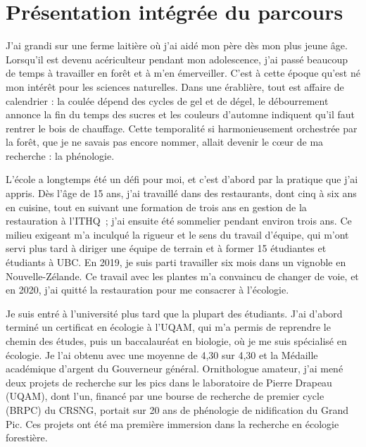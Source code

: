 \documentclass[12pt]{article}
\begin{document}
\section*{Présentation intégrée du parcours}
J'ai grandi sur une ferme laitière où j'ai aidé mon père dès mon plus jeune âge. Lorsqu'il est devenu acériculteur pendant mon adolescence, j'ai passé beaucoup de temps à travailler en forêt et à m'en émerveiller. C'est à cette époque qu'est né mon intérêt pour les sciences naturelles. Dans une érablière, tout est affaire de calendrier : la coulée dépend des cycles de gel et de dégel, le débourrement annonce la fin du temps des sucres et les couleurs d'automne indiquent qu'il faut rentrer le bois de chauffage. Cette temporalité si harmonieusement orchestrée par la forêt, que je ne savais pas encore nommer, allait devenir le cœur de ma recherche : la phénologie.

L'école a longtemps été un défi pour moi, et c'est d'abord par la pratique que j'ai appris. Dès l'âge de 15 ans, j'ai travaillé dans des restaurants, dont cinq à six ans en cuisine, tout en suivant une formation de trois ans en gestion de la restauration à l'ITHQ~; j'ai ensuite été sommelier pendant environ trois ans. Ce milieu exigeant m'a inculqué la rigueur et le sens du travail d'équipe, qui m'ont servi plus tard à diriger une équipe de terrain et à former 15 étudiantes et étudiants à UBC. En 2019, je suis parti travailler six mois dans un vignoble en Nouvelle-Zélande. Ce travail avec les plantes m'a convaincu de changer de voie, et en 2020, j'ai quitté la restauration pour me consacrer à l'écologie.

Je suis entré à l'université plus tard que la plupart des étudiants. J'ai d'abord terminé un certificat en écologie à l'UQAM, qui m'a permis de reprendre le chemin des études, puis un baccalauréat en biologie, où je me suis spécialisé en écologie. Je l'ai obtenu avec une moyenne de 4,30 sur 4,30 et la Médaille académique d'argent du Gouverneur général. Ornithologue amateur, j'ai mené deux projets de recherche sur les pics dans le laboratoire de Pierre Drapeau (UQAM), dont l'un, financé par une bourse de recherche de premier cycle (BRPC) du CRSNG, portait sur 20 ans de phénologie de nidification du Grand Pic. Ces projets ont été ma première immersion dans la recherche en écologie forestière.
\end{document}
